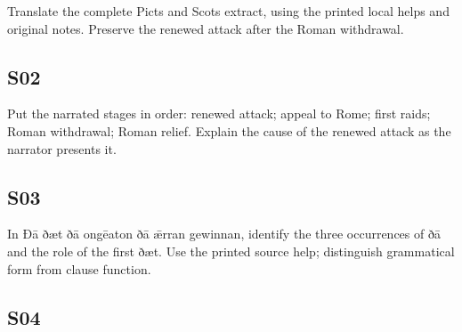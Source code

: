 \par\begin{minipage}{\linewidth}\raggedright
Translate the complete Picts and Scots extract, using the printed local helps and original notes. Preserve the renewed attack after the Roman withdrawal.

\end{minipage}\par\addvspace{4pt}

\subsection*{S02}

\par\begin{minipage}{\linewidth}\raggedright
Put the narrated stages in order: renewed attack; appeal to Rome; first raids; Roman withdrawal; Roman relief. Explain the cause of the renewed attack as the narrator presents it.

\end{minipage}\par\addvspace{4pt}

\subsection*{S03}

\par\begin{minipage}{\linewidth}\raggedright
In Ðā ðæt ðā ongēaton ðā ǣrran gewinnan, identify the three occurrences of ðā and the role of the first ðæt. Use the printed source help; distinguish grammatical form from clause function.

\end{minipage}\par\addvspace{4pt}

\subsection*{S04}

